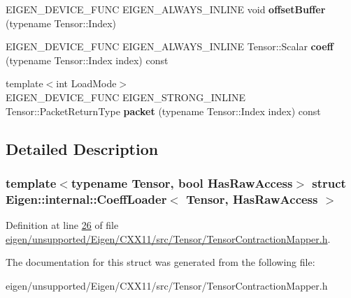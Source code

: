 \begin{DoxyCompactItemize}
E\+I\+G\+E\+N\+\_\+\+D\+E\+V\+I\+C\+E\+\_\+\+F\+U\+NC E\+I\+G\+E\+N\+\_\+\+A\+L\+W\+A\+Y\+S\+\_\+\+I\+N\+L\+I\+NE void {\bfseries offset\+Buffer} (typename Tensor\+::\+Index)
\item 
\mbox{\label{struct_eigen_1_1internal_1_1_coeff_loader_ae63c80db8734f22daf0f01a9cffc2099}} 
E\+I\+G\+E\+N\+\_\+\+D\+E\+V\+I\+C\+E\+\_\+\+F\+U\+NC E\+I\+G\+E\+N\+\_\+\+A\+L\+W\+A\+Y\+S\+\_\+\+I\+N\+L\+I\+NE Tensor\+::\+Scalar {\bfseries coeff} (typename Tensor\+::\+Index index) const
\item 
\mbox{\label{struct_eigen_1_1internal_1_1_coeff_loader_ab5563f7024db6c443acc9ec4b19e5f52}} 
{\footnotesize template$<$int Load\+Mode$>$ }\\E\+I\+G\+E\+N\+\_\+\+D\+E\+V\+I\+C\+E\+\_\+\+F\+U\+NC E\+I\+G\+E\+N\+\_\+\+S\+T\+R\+O\+N\+G\+\_\+\+I\+N\+L\+I\+NE Tensor\+::\+Packet\+Return\+Type {\bfseries packet} (typename Tensor\+::\+Index index) const
\end{DoxyCompactItemize}


\subsection{Detailed Description}
\subsubsection*{template$<$typename Tensor, bool Has\+Raw\+Access$>$\newline
struct Eigen\+::internal\+::\+Coeff\+Loader$<$ Tensor, Has\+Raw\+Access $>$}



Definition at line \hyperlink{eigen_2unsupported_2_eigen_2_c_x_x11_2src_2_tensor_2_tensor_contraction_mapper_8h_source_l00026}{26} of file \hyperlink{eigen_2unsupported_2_eigen_2_c_x_x11_2src_2_tensor_2_tensor_contraction_mapper_8h_source}{eigen/unsupported/\+Eigen/\+C\+X\+X11/src/\+Tensor/\+Tensor\+Contraction\+Mapper.\+h}.



The documentation for this struct was generated from the following file\+:\begin{DoxyCompactItemize}
\item 
eigen/unsupported/\+Eigen/\+C\+X\+X11/src/\+Tensor/\+Tensor\+Contraction\+Mapper.\+h\end{DoxyCompactItemize}
